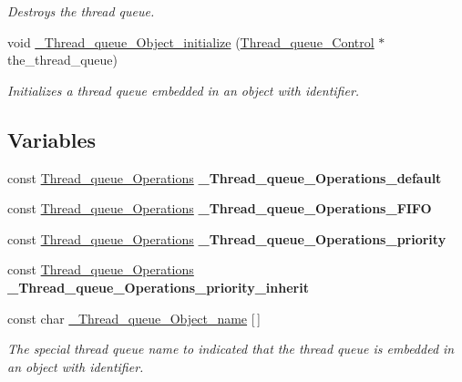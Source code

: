 \begin{DoxyCompactItemize}
\begin{DoxyCompactList}\small\item\em Destroys the thread queue. \end{DoxyCompactList}\item 
void \mbox{\hyperlink{group__RTEMSScoreThreadQueue_gadff2605d33f07f210c22844f1ae71eaf}{\+\_\+\+Thread\+\_\+queue\+\_\+\+Object\+\_\+initialize}} (\mbox{\hyperlink{structThread__queue__Control}{Thread\+\_\+queue\+\_\+\+Control}} $\ast$the\+\_\+thread\+\_\+queue)
\begin{DoxyCompactList}\small\item\em Initializes a thread queue embedded in an object with identifier. \end{DoxyCompactList}\end{DoxyCompactItemize}
\subsection*{Variables}
\begin{DoxyCompactItemize}
\item 
\mbox{\label{group__RTEMSScoreThreadQueue_ga8882291b516b6920d04dfbcc45faa443}} 
const \mbox{\hyperlink{structThread__queue__Operations}{Thread\+\_\+queue\+\_\+\+Operations}} {\bfseries \+\_\+\+Thread\+\_\+queue\+\_\+\+Operations\+\_\+default}
\item 
\mbox{\label{group__RTEMSScoreThreadQueue_ga330a81a2edf215fbfed2b82e39d43681}} 
const \mbox{\hyperlink{structThread__queue__Operations}{Thread\+\_\+queue\+\_\+\+Operations}} {\bfseries \+\_\+\+Thread\+\_\+queue\+\_\+\+Operations\+\_\+\+F\+I\+FO}
\item 
\mbox{\label{group__RTEMSScoreThreadQueue_ga02d697e0f80325c9d1130798b428520e}} 
const \mbox{\hyperlink{structThread__queue__Operations}{Thread\+\_\+queue\+\_\+\+Operations}} {\bfseries \+\_\+\+Thread\+\_\+queue\+\_\+\+Operations\+\_\+priority}
\item 
\mbox{\label{group__RTEMSScoreThreadQueue_ga872841276b9740c8b2358485795f2feb}} 
const \mbox{\hyperlink{structThread__queue__Operations}{Thread\+\_\+queue\+\_\+\+Operations}} {\bfseries \+\_\+\+Thread\+\_\+queue\+\_\+\+Operations\+\_\+priority\+\_\+inherit}
\item 
const char \mbox{\hyperlink{group__RTEMSScoreThreadQueue_gaa050ed6bbc86ca717c26cd68b93a49b7}{\+\_\+\+Thread\+\_\+queue\+\_\+\+Object\+\_\+name}} \mbox{[}$\,$\mbox{]}
\begin{DoxyCompactList}\small\item\em The special thread queue name to indicated that the thread queue is embedded in an object with identifier. \end{DoxyCompactList}\end{DoxyCompactItemize}


